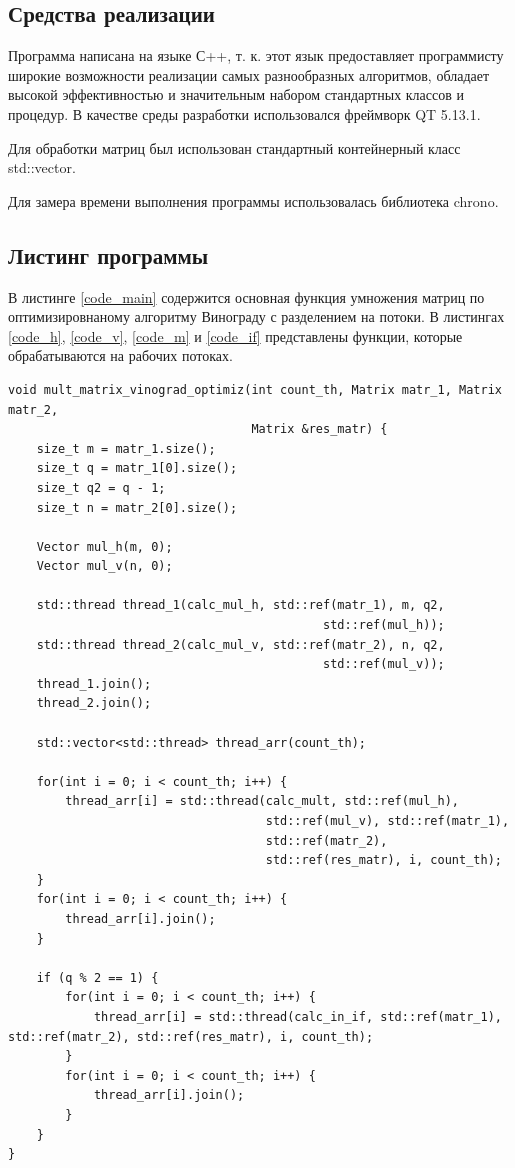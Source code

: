 \documentclass[a4paper,12pt]{article}
\begin{document}
	
	\subsection{Средства реализации}
	Программа написана на языке С++, т. к. этот язык предоставляет программисту широкие возможности реализации самых разнообразных алгоритмов, обладает высокой эффективностью и значительным набором стандартных классов и процедур. В качестве среды разработки использовался  фреймворк QT 5.13.1.
	
	Для обработки матриц был использован стандартный контейнерный класс std::vector.
	
	Для замера времени выполнения программы использовалась библиотека chrono.
	

    
    \subsection{Листинг программы}
	В листинге \ref{code_main} содержится основная функция умножения матриц по оптимизировнаному алгоритму Винограду с разделением на потоки. В листингах \ref{code_h},  \ref{code_v}, \ref{code_m} и \ref{code_if} представлены функции, которые обрабатываются на рабочих потоках. 

		\begin{lstlisting}[label=code_main, caption={Основная функция}]
	void mult_matrix_vinograd_optimiz(int count_th, Matrix matr_1, Matrix matr_2,
                                  Matrix &res_matr) {
    size_t m = matr_1.size();
    size_t q = matr_1[0].size();
    size_t q2 = q - 1;
    size_t n = matr_2[0].size();

    Vector mul_h(m, 0);
    Vector mul_v(n, 0);

    std::thread thread_1(calc_mul_h, std::ref(matr_1), m, q2,
    										std::ref(mul_h));
    std::thread thread_2(calc_mul_v, std::ref(matr_2), n, q2,
    										std::ref(mul_v));
    thread_1.join();
    thread_2.join();

    std::vector<std::thread> thread_arr(count_th);

    for(int i = 0; i < count_th; i++) {
        thread_arr[i] = std::thread(calc_mult, std::ref(mul_h),
                                    std::ref(mul_v), std::ref(matr_1),
                                    std::ref(matr_2),
                                    std::ref(res_matr), i, count_th);
    }
    for(int i = 0; i < count_th; i++) {
        thread_arr[i].join();
    }

    if (q % 2 == 1) {
        for(int i = 0; i < count_th; i++) {
            thread_arr[i] = std::thread(calc_in_if, std::ref(matr_1), std::ref(matr_2), std::ref(res_matr), i, count_th);
        }
        for(int i = 0; i < count_th; i++) {
            thread_arr[i].join();
        }
    }
}
	\end{lstlisting}  
	
\end{document}
